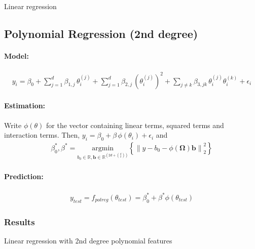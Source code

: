 \documentclass[a4paper, 12pt]{article}
\newcommand{\norm}[1]{\left\lVert#1\right\rVert}
\newcommand{\sciebopath}{/home/tm/sciebo/uni-master/master-thesis/structUncertainty/}
\begin{document}
\begin{table}[!h]
\footnotesize{

\caption{Linear regression}
}
\end{table}

\subsection{Polynomial Regression (2nd degree)}

\paragraph{Model:}
\begin{align}\label{eq:polynomial_model} y_i = \beta_0 + \sum_{j=1}^d \beta_{1,j} \, \theta_i^{(j)} + \sum_{j=1}^d \beta_{2,j} \, (\theta_i^{(j)})^2 + \sum_{j\neq k} \beta_{3,jk} \, \theta_i^{(j)} \theta_i^{(k)} + \epsilon_i
\end{align}

\paragraph{Estimation:}
Write $\phi(\theta)$ for the vector containing linear terms, squared terms and interaction terms.
Then, $y_i = \beta_0 + \beta \, \phi(\theta_i) + \epsilon_i$ and
\begin{align}
  \beta_0^*, \beta^* = \underset{b_0 \in \mathbb{R}, \bm{b} \in \mathbb{R}^{(2d + {d \choose 2})}}{\text{argmin}} \left\{  \norm{y - b_0 - \phi(\bm{\Omega}) \bm{b}}_2^2 \right \}
\end{align}

\paragraph{Prediction:}
\begin{align}\label{eq:polynomial_prediction}
  y_{test} = f_{polreg}(\theta_{test}) = \beta_0^* + \beta^* \phi(\theta_{test})
\end{align}

\subsubsection{Results}

\begin{table}[!h]
\footnotesize{

\caption{Linear regression with 2nd degree polynomial features}
}
\end{table}
\end{document}
